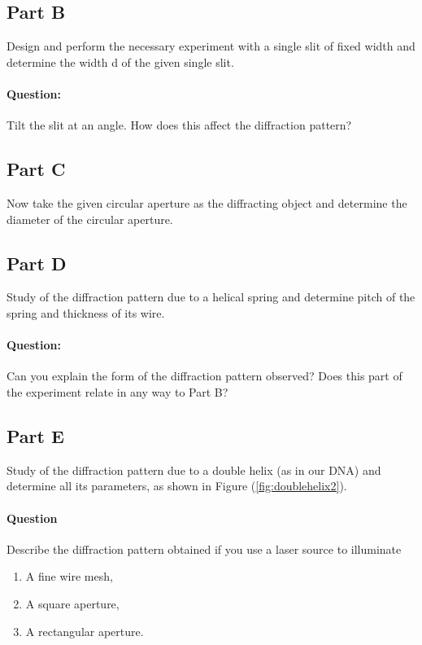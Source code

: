 \subsection*{Part B}

Design and perform the necessary experiment with a single slit of fixed width and determine the width d of the given single slit.

\begin{question}
\paragraph{Question:} Tilt the slit at an angle. How does this affect the diffraction pattern?
\end{question}


\subsection*{Part C}

Now take the given circular aperture as the diffracting object and determine the diameter of the circular aperture.

\subsection*{Part D}

Study of the diffraction pattern due to a helical spring and determine pitch of the spring and thickness of its wire. 


\begin{question}
\paragraph{Question:} Can you explain the form of the diffraction pattern observed? Does this part of the experiment relate in any way to Part B? 
\end{question}

\subsection*{Part E}

Study of the diffraction pattern due to a double helix (as in our DNA) and determine all its parameters, as shown in Figure (\ref{fig:doublehelix2}).

\begin{question}
\paragraph{Question} Describe the diffraction pattern obtained if you use a laser source to illuminate
\begin{enumerate}[label=(\alph*)]
    \itemsep0em
    \item A fine wire mesh,
    \item A square aperture,
    \item A rectangular aperture.
\end{enumerate}
\end{question}



